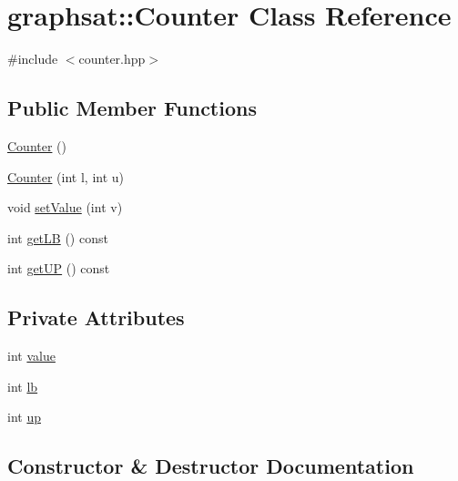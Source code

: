 \hypertarget{classgraphsat_1_1_counter}{}\section{graphsat\+::Counter Class Reference}
\label{classgraphsat_1_1_counter}


{\ttfamily \#include $<$counter.\+hpp$>$}

\subsection*{Public Member Functions}
\begin{DoxyCompactItemize}
\item 
\mbox{\hyperlink{classgraphsat_1_1_counter_a47f1261e6a560cd55aac5c994e52a07a}{Counter}} ()
\item 
\mbox{\hyperlink{classgraphsat_1_1_counter_aba7dd07985bb39b04a5858047bfbd357}{Counter}} (int l, int u)
\item 
void \mbox{\hyperlink{classgraphsat_1_1_counter_a738c85993973ea73559a7dd9e59de346}{set\+Value}} (int v)
\item 
int \mbox{\hyperlink{classgraphsat_1_1_counter_a9d6d9d4d32146e571e492bd042376f5e}{get\+LB}} () const
\item 
int \mbox{\hyperlink{classgraphsat_1_1_counter_a5b073dfc1370d3457cf693053d4b2d87}{get\+UP}} () const
\end{DoxyCompactItemize}
\subsection*{Private Attributes}
\begin{DoxyCompactItemize}
\item 
int \mbox{\hyperlink{classgraphsat_1_1_counter_aeefe32c89acd4509360886f8c037683c}{value}}
\item 
int \mbox{\hyperlink{classgraphsat_1_1_counter_a8e5a22b7c1cdb1d075aa0bba1e59ca7f}{lb}}
\item 
int \mbox{\hyperlink{classgraphsat_1_1_counter_a782128acfad183e7758d9fb899c9afb2}{up}}
\end{DoxyCompactItemize}


\subsection{Constructor \& Destructor Documentation}
\mbox{\label{classgraphsat_1_1_counter_a47f1261e6a560cd55aac5c994e52a07a}} 
